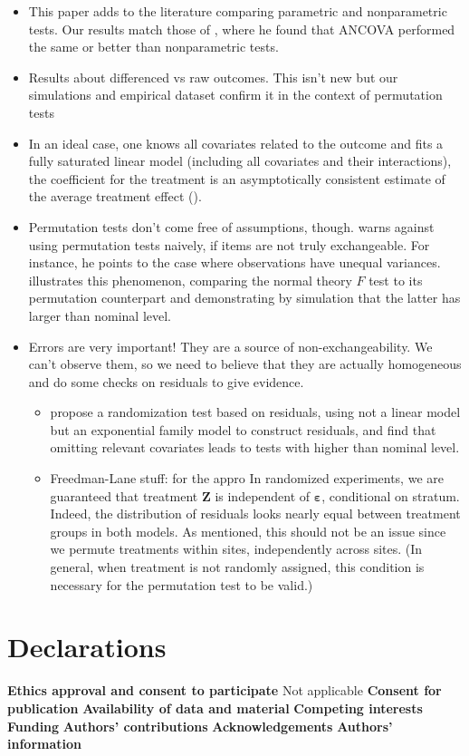 \documentclass[11pt]{article}
\newcommand{\bit}{\begin{itemize}}
\newcommand{\eit}{\end{itemize}}
\newcommand{\todo}[1]{{\color{red}{TO DO: \sc #1}}}
\begin{document}
\bit
\item This paper adds to the literature comparing parametric and nonparametric tests.
Our results match those of \citet{vickers_parametric_2005}, where he found that ANCOVA performed the same or better than nonparametric tests.
\item Results about differenced vs raw outcomes. This isn't new but our simulations and empirical dataset confirm it in the context of permutation tests
\item In an ideal case, one knows all covariates related to the outcome and fits a fully saturated linear model (including all covariates and their interactions), the coefficient for the treatment is an asymptotically consistent estimate of the average treatment effect (\cite{lin_agnostic_2013}).
\item Permutation tests don't come free of assumptions, though.  \citet{romano_behavior_1990} warns against using permutation tests naively, if items are not truly exchangeable. For instance, he points to the case where observations have unequal variances.  \citet{boik_fisherpitman_1987} illustrates this phenomenon, comparing the normal theory $F$ test to its permutation counterpart and demonstrating by simulation that the latter has larger than nominal level.
\item Errors are very important!  They are a source of non-exchangeability.  We can't observe them, so we need to believe that they are actually homogeneous and do some checks on residuals to give evidence.
\bit
\item \citet{gail_tests_1988} propose a randomization test based on residuals, using not a linear model but an exponential family model to construct residuals, and find that omitting relevant covariates leads to tests with higher than nominal level.  \todo{perhaps this is something that one should be mindful of when using these linear model based tests.}
\item Freedman-Lane stuff: for the appro
In randomized experiments, we are guaranteed that treatment $\mathbf{Z}$ is independent of $\mathbf{\varepsilon}$, conditional on stratum.
Indeed, the distribution of residuals looks nearly equal between treatment groups in both models.
As mentioned, this should not be an issue since we permute treatments within sites, independently across sites.
(In general, when treatment is not randomly assigned, this condition is necessary for the permutation test to be valid.)
\eit
\eit



\section{Declarations}
\textbf{Ethics approval and consent to participate}
Not applicable
\textbf{Consent for publication}
\textbf{Availability of data and material}
\textbf{Competing interests}
\textbf{Funding}
\textbf{Authors' contributions}
\textbf{Acknowledgements}
\textbf{Authors' information}



\end{document}
